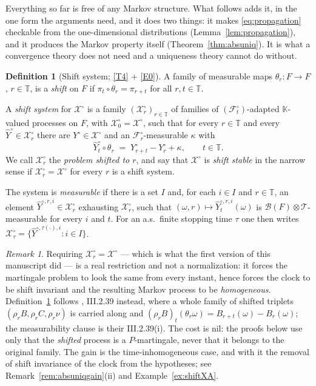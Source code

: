 \documentclass[11pt,a4paper]{article}
\theoremstyle{plain}
\theoremstyle{definition}
\newtheorem{definition}[theorem]{Definition}
\theoremstyle{remark}
\newtheorem{remark}[theorem]{Remark}
\newcommand{\T}{\mathbb{T}}                     %
\newcommand{\Bor}{\mathcal{B}}                 %
\newcommand{\Filt}{\mathcal{F}}
\newcommand{\K}{\mathbb{K}}
\newcommand{\XX}{\mathcal{X}}                  %
\newcommand{\JS}{\cite{JS03}}
\begin{document}
Everything so far is free of any Markov structure.  What follows adds it, in the
one form the arguments need, and it does two things: it makes
\eqref{eq:propagation} checkable from the one-dimensional distributions
(Lemma~\ref{lem:propagation}), and it produces the Markov property itself
(Theorem~\ref{thm:absuniq}).  It is what a convergence theory
does not need and a
uniqueness theory cannot do without.

\begin{definition}[Shift system; \eqref{T4} + \eqref{E0}]
  \label{def:shiftstable}
  A family of measurable maps $\theta_r : F \to F$, $r \in \T$, is a
  \emph{shift} on $F$ if $\pi_t \circ \theta_r = \pi_{r+t}$ for all $r,t \in \T$.

  A \emph{shift system} for $\XX^\circ$ is a family $(\XX^\circ_r)_{r \in \T}$ of
  families of $(\Filt^\circ_t)$-adapted $\K$-valued processes on $F$, with
  $\XX^\circ_0 = \XX^\circ$, such that for every $r \in \T$ and every
  $\hat{Y}^\circ \in \XX^\circ_r$ there are $Y^\circ \in \XX^\circ$ and an
  $\Filt^\circ_r$-measurable $\kappa$ with
  \begin{equation}
    \label{eq:shiftstable}
    \hat{Y}^\circ_t \circ \theta_r \;=\; Y^\circ_{r+t} - Y^\circ_r + \kappa ,
    \qquad t \in \T .
  \end{equation}
  We call $\XX^\circ_r$ the \emph{problem shifted to $r$}, and say that
  $\XX^\circ$ is \emph{shift stable} in the narrow sense if
  $\XX^\circ_r = \XX^\circ$ for every $r$ is a shift system.

  The system is \emph{measurable} if there is a set $I$ and, for each $i \in I$
  and $r \in \T$, an element $\hat{Y}^{\circ,r,i} \in \XX^\circ_r$ exhausting
  $\XX^\circ_r$, such that $(\omega,r) \mapsto \hat{Y}^{\circ,r,i}_t(\omega)$ is
  $\Bor(F) \otimes \mathcal{T}$-measurable for every $i$ and $t$.  For an
  a.s.\ finite stopping time $\tau$ one then writes
  $\XX^\circ_\tau = \{ \hat{Y}^{\circ,\tau(\cdot),i} : i \in I \}$.
\end{definition}

\begin{remark}
  \label{rem:shiftsystemwhy}
  Requiring $\XX^\circ_r = \XX^\circ$ --- which is what the first version of this
  manuscript did --- is a real restriction and not a normalization: it forces the
  martingale problem to look the same from every instant, hence forces the clock
  to be shift invariant and the resulting Markov process to be
  \emph{homogeneous}.  Definition~\ref{def:shiftstable} follows
  \JS, III.2.39 instead, where a whole family of shifted triplets
  $(\rho_r B, \rho_r C, \rho_r \nu)$ is carried along and
  $(\rho_r B)_t(\theta_r\omega) = B_{r+t}(\omega) - B_r(\omega)$; the measurability
  clause is their III.2.39(i).  The cost is nil: the proofs below use only that
  the \emph{shifted} process is a $P$-martingale, never that it belongs to the
  original family.  The gain is the time-inhomogeneous case, and with it the
  removal of shift invariance of the clock from the hypotheses; see
  Remark~\ref{rem:absuniqgain}(ii) and Example~\ref{ex:shiftXA}.
\end{remark}
\end{document}
